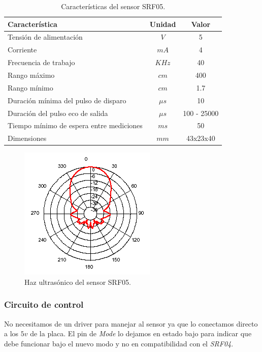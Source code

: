 \begin{table}[ht]
	\begin{center}
		\begin{tabular}{|l|c|c|}
			\hline
			Caracter\'istica & Unidad & Valor\\
			\hline
			Tensi\'on de alimentaci\'on & $V$ & 5 \\
			Corriente & $mA$ & 4 \\
			Frecuencia de trabajo & $KHz$ & 40 \\
			Rango m\'aximo & $cm$ & 400 \\
			Rango m\'inimo & $cm$ & 1.7 \\
			Duraci\'on m\'inima del pulso de disparo & $\mu s$ & 10 \\
			Duraci\'on del pulso eco de salida & $\mu s$& 100 - 25000 \\
			Tiempo m\'inimo de espera entre mediciones & $m s$ & 50 \\
			Dimensiones & $mm$ & 43x23x40 \\
			\hline
		\end{tabular}
	\end{center}
	\caption{Caracter\'isticas del sensor SRF05.}
	\label{hT_srf05}
\end{table}

\begin{figure}[ht]
	\centering
	\includegraphics[scale=0.5]{srf05_beam.png}
	\caption{Haz ultras\'onico del sensor SRF05.}
	\label{hF_srf05}
\end{figure}

\subsubsection{Circuito de control}
\label{h_sensado_ultrasonido_circuito}

No necesitamos de un driver para manejar al sensor ya que lo conectamos directo a los $5v$ de la placa.
El pin de \emph{Mode} lo dejamos en estado bajo para indicar que debe funcionar bajo el nuevo modo y no en compatibilidad con el \emph{SRF04}.

